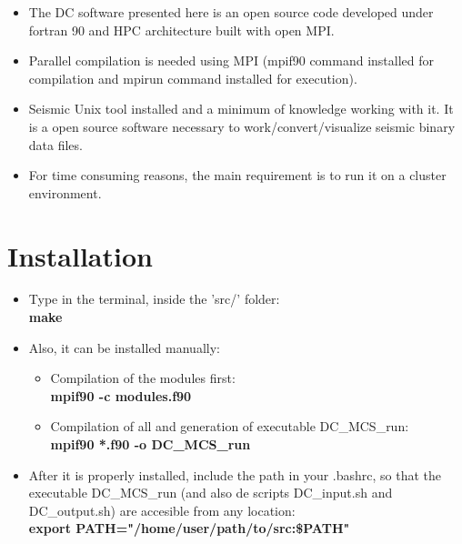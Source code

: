 \documentclass[11pt, oneside]{article}   	%
\begin{document}
\begin{itemize}

\item The DC software presented here is an open source code developed under fortran 90 and HPC architecture built with open MPI. 
\item Parallel compilation is needed using MPI (mpif90 command installed for compilation and mpirun command installed for execution).
\item Seismic Unix tool \cite{SU} installed and a minimum of knowledge working with it. It is a open source software necessary to work/convert/visualize seismic binary data files.
\item For time consuming reasons, the main requirement is to run it on a cluster environment.

\end{itemize}

\section{Installation}\label{sec2}
\begin{itemize}

\item Type in the terminal, inside the '{src/}' folder: \\
\textbf{make} \\
\item Also, it can be installed manually:
\begin{itemize}
\item Compilation of the modules first:  \\
\textbf{mpif90 -c modules.f90} \\
\item Compilation of all and generation of executable DC\_MCS\_run: \\
\textbf{mpif90 *.f90 -o DC\_MCS\_run}
\end{itemize}

\item After it is properly installed, include the path in your .bashrc, so that the executable DC\_MCS\_run (and also de scripts DC\_input.sh and DC\_output.sh) are accesible from any location: \\
\textbf{export PATH="/home/user/path/to/src:\$PATH"}

\end{itemize}
\end{document}
